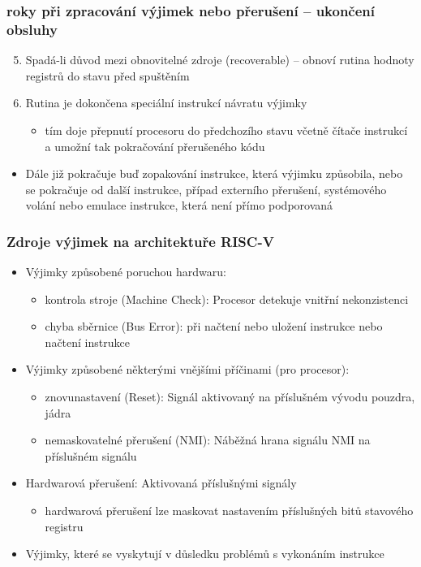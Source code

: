 \documentclass{beamer}
\begin{document}
\begin{frame}
\frametitle{roky při zpracování výjimek nebo přerušení -- ukončení obsluhy}

\begin{enumerate}
 \setcounter{enumi}{4}
 \item Spadá-li důvod mezi obnovitelné zdroje (recoverable) -- obnoví rutina hodnoty registrů do stavu před spuštěním
 \item Rutina je dokončena speciální instrukcí návratu výjimky
 \begin{itemize}
  \item tím doje přepnutí procesoru do předchozího stavu včetně čítače instrukcí a umožní tak pokračování
        přerušeného kódu
 \end{itemize}
\end{enumerate}
\begin{itemize}
 \item Dále již pokračuje buď zopakování instrukce, která výjimku způsobila, nebo se pokračuje od další instrukce,
       případ externího přerušení, systémového volání nebo emulace instrukce, která není přímo podporovaná
\end{itemize}
\end{frame}

\begin{frame}
\frametitle{Zdroje výjimek na architektuře RISC-V}

\begin{itemize}
 \item Výjimky způsobené poruchou hardwaru:
 \begin{itemize}
  \item kontrola stroje (Machine Check): Procesor detekuje vnitřní nekonzistenci
  \item chyba sběrnice (Bus Error): při načtení nebo uložení instrukce nebo načtení instrukce
 \end{itemize}
 \item Výjimky způsobené některými vnějšími příčinami (pro procesor):
 \begin{itemize}
  \item znovunastavení (Reset): Signál aktivovaný na příslušném vývodu pouzdra, jádra
  \item nemaskovatelné přerušení (NMI): Náběžná hrana signálu NMI na příslušném signálu
 \end{itemize}
 \item Hardwarová přerušení: Aktivovaná příslušnými signály
 \begin{itemize}
  \item hardwarová přerušení lze maskovat nastavením příslušných bitů stavového registru
 \end{itemize}
 \item Výjimky, které se vyskytují v důsledku problémů s vykonáním instrukce
\end{itemize}
\end{frame}
\end{document}
